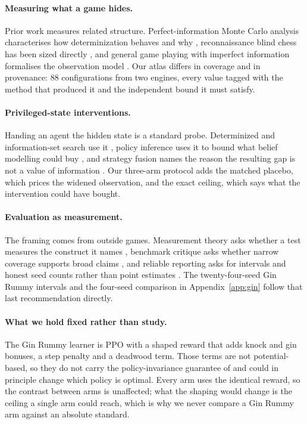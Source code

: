 \documentclass{article}
\begin{document}
\paragraph{Measuring what a game hides.} Prior work measures related structure. Perfect-information Monte Carlo analysis characterises how determinization behaves and why \citep{pimc}, reconnaissance blind chess has been sized directly \citep{rbccomplexity}, and general game playing with imperfect information formalises the observation model \citep{ggpii}. Our atlas differs in coverage and in provenance: 88 configurations from two engines, every value tagged with the method that produced it and the independent bound it must satisfy.

\paragraph{Privileged-state interventions.} Handing an agent the hidden state is a standard probe. Determinized and information-set search use it \citep{ismcts,pimc}, policy inference uses it to bound what belief modelling could buy \citep{policyinference}, and strategy fusion names the reason the resulting gap is not a value of information \citep{strategyfusion,rebel}. Our three-arm protocol adds the matched placebo, which prices the widened observation, and the exact ceiling, which says what the intervention could have bought.

\paragraph{Evaluation as measurement.} The framing comes from outside games. Measurement theory asks whether a test measures the construct it names \citep{measurementfairness}, benchmark critique asks whether narrow coverage supports broad claims \citep{wholeworld}, and reliable reporting asks for intervals and honest seed counts rather than point estimates \citep{rliable}. The twenty-four-seed Gin Rummy intervals and the four-seed comparison in Appendix~\ref{app:gin} follow that last recommendation directly.

\paragraph{What we hold fixed rather than study.} The Gin Rummy learner is PPO \citep{ppo} with a shaped reward that adds knock and gin bonuses, a step penalty and a deadwood term. Those terms are not potential-based, so they do not carry the policy-invariance guarantee of \citet{shaping} and could in principle change which policy is optimal. Every arm uses the identical reward, so the contrast between arms is unaffected; what the shaping would change is the ceiling a single arm could reach, which is why we never compare a Gin Rummy arm against an absolute standard.
\end{document}

